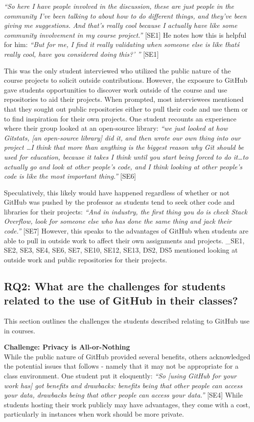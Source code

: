 \textit{``So here I have people involved in the discussion, these are just people in the community I've been talking to about how to do different things, and they've been giving me suggestions. And that's really cool because I actually have like some community involvement in my course project.''} [SE1] He notes how this is helpful for him: \textit{``But for me, I find it really validating when someone else is like \'that\'s really cool, have you considered doing this?' ''} [SE1]

This was the only student interviewed who utilized the public nature of the course projects to solicit outside contributions. However, the exposure to GitHub gave students opportunities to discover work outside of the course and use repositories to aid their projects. When prompted, most interviewees mentioned that they sought out public repositories either to pull their code and use them or to find inspiration for their own projects. One student recounts an experience where their group looked at an open-source library: \textit{``we just looked at how Gitstats, [an open-source library] did it, and then wrote our own thing into our project \ldots I think that more than anything is the biggest reason why Git should be used for education, because it takes I think until you start being forced to do it\ldots to actually go and look at other people's code, and I think looking at other people's code is like the most important thing.''} [SE6]

Speculatively, this likely would have happened regardless of whether or not GitHub was pushed by the professor as students tend to seek other code and libraries for their projects: \textit{``And in industry, the first thing you do is check Stack Overflow, look for someone else who has done the same thing and jack their code.''} [SE7] However, this speaks to the advantages of GitHub when students are able to pull in outside work to affect their own assignments and projects. _{SE1, SE2, SE3, SE4, SE6, SE7, SE10, SE12, SE13, DS2, DS5} mentioned looking at outside work and public repositories for their projects.

\subsection{RQ2: What are the challenges for students related to the use of GitHub in their classes?}
This section outlines the challenges the students described relating to GitHub use in courses. 

\textbf{Challenge: Privacy is All-or-Nothing} \\
While the public nature of GitHub provided several benefits, others acknowledged the potential issues that follows - namely that it may not be appropriate for a class environment. One student put it eloquently: \textit{``So [using GitHub for your work has] got benefits and drawbacks: benefits being that other people can access your data, drawbacks being that other people can access your data.''} [SE4] While students hosting their work publicly may have advantages, they come with a cost, particularly in instances when work should be more private.

